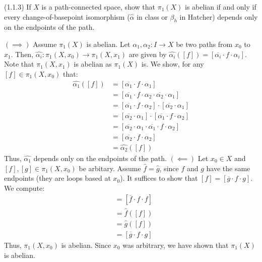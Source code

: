 \documentclass[12pt]{article}
\begin{document}
\begin{problab}{3}
(1.1.3) If \( X \) is a path-connected space, show that \( \pi_1(X) \) is abelian if and only if every change-of-basepoint isomorphism (\( \hat{\alpha} \) in class or \( \beta_h \) in Hatcher) depends only on the endpoints of the path.
\end{problab}
\begin{solu}
    $(\implies)$ Assume $\pi_1(X)$ is abelian. Let $\alpha_1, \alpha_2: I \to X$ be two paths from $x_0$ to $x_1$. Then, $\hat{\alpha_i}: \pi_1(X, x_0) \to \pi_1(X, x_1)$ are given by $\hat{\alpha_i}([f]) = [\overline{\alpha_i} \cdot f \cdot \alpha_i]$. Note that $\pi_1(X, x_1)$ is abelian as $\pi_1(X)$ is. We show, for any $[f] \in \pi_1(X, x_0)$ that:
    \begin{align*}
        \hat{\alpha_1}([f]) &= [\overline{\alpha_1} \cdot f \cdot \alpha_1] \\
        &= [\overline{\alpha_1} \cdot f \cdot \alpha_2 \cdot \overline{\alpha_2} \cdot \alpha_1] \\
        &= [\overline{\alpha_1} \cdot f \cdot \alpha_2] \cdot [\overline{\alpha_2} \cdot \alpha_1] \\
        &= [\overline{\alpha_2} \cdot \alpha_1] \cdot [\overline{\alpha_1} \cdot f \cdot \alpha_2] \\
        &= [\overline{\alpha_2} \cdot \alpha_1 \cdot \overline{\alpha_1} \cdot f \cdot \alpha_2] \\
        &= [\overline{\alpha_2} \cdot f \cdot \alpha_2] \\
        &= \hat{\alpha_2}([f])
    \end{align*} 
    Thus, $\hat{\alpha_1}$ depends only on the endpoints of the path. \bbni
    $(\impliedby)$ Let $x_0 \in X$ and $[f], [g] \in \pi_1(X, x_0)$ be arbitary. Assume $\hat{f} = \hat{g}$, since $f$ and $g$ have the same endpoints (they are loops based at $x_0$). It suffices to show that $[f] = [\overline{g} \cdot f \cdot g]$. We compute:
    \begin{align*}
        [f] &= [\overline{f} \cdot f \cdot f] \\
        &= \hat{f}([f]) \\
        &= \hat{g}([f]) \\
        &= [\overline{g} \cdot f \cdot g]
    \end{align*}
    Thus, $\pi_1(X, x_0)$ is abelian. Since $x_0$ was arbitrary, we have shown that $\pi_1(X)$ is abelian.
\end{solu}
\newpage
\end{document}
